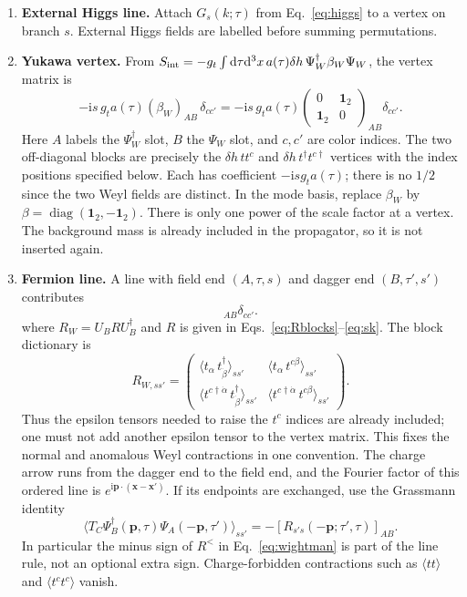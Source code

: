 \documentclass[a4paper,12pt]{article}
\newcommand{\ii}{\mathrm i}
\newcommand{\dd}{\mathrm d}
\newcommand{\one}{\mathbf1_2}
\begin{document}
\begin{enumerate}
\item \textbf{External Higgs line.} Attach $G_s(k;\tau)$ from
Eq.~\eqref{eq:higgs} to a vertex on branch $s$. External Higgs fields are
labelled before summing permutations.

\item \textbf{Yukawa vertex.} From
$S_{\rm int}=-g_t\int\dd\tau\dd^3x\,a(\tau)\delta h\,
\Psi_W^\dagger\beta_W\Psi_W$, the vertex matrix is
\begin{equation}
 -\ii s\,g_t a(\tau)(\beta_W)_{AB}\,\delta_{cc'}
 =-\ii s\,g_t a(\tau)
 \begin{pmatrix}0&\one\\\one&0\end{pmatrix}_{AB}\delta_{cc'}.
 \label{eq:vertex-rule}
\end{equation}
Here $A$ labels the $\Psi_W^\dagger$ slot, $B$ the $\Psi_W$ slot, and
$c,c'$ are color indices. The two off-diagonal blocks are precisely the
$\delta h\,tt^c$ and $\delta h\,t^\dagger t^{c\dagger}$ vertices with the
index positions specified below. Each has coefficient $-\ii s g_t a(\tau)$;
there is no $1/2$ since the two Weyl fields are distinct. In the mode basis,
replace $\beta_W$ by $\beta=\operatorname{diag}(\one,-\one)$.
There is only one power of the scale factor at a vertex. The background mass
is already included in the propagator, so it is not inserted again.

\item \textbf{Fermion line.} A line with field end $(A,\tau,s)$ and dagger
end $(B,\tau',s')$ contributes
\begin{equation}
 [R_{W,ss'}(\bm p;\tau,\tau')]_{AB}\delta_{cc'}.
\end{equation}
where $R_W=U_BR U_B^\dagger$ and $R$ is given in
Eqs.~\eqref{eq:Rblocks}--\eqref{eq:sk}. The block dictionary is
\begin{equation}
 R_{W,ss'}=
 \begin{pmatrix}
 \langle t_\alpha\,t^\dagger_{\dot\beta}\rangle_{ss'}&
 \langle t_\alpha\,t^{c\beta}\rangle_{ss'}\\
 \langle t^{c\dagger\dot\alpha}\,t^\dagger_{\dot\beta}\rangle_{ss'}&
 \langle t^{c\dagger\dot\alpha}\,t^{c\beta}\rangle_{ss'}
 \end{pmatrix}.
 \label{eq:weyl-line-rule}
\end{equation}
Thus the epsilon tensors needed to raise the $t^c$ indices are already included;
one must not add another epsilon tensor to the vertex matrix. This fixes the
normal and anomalous Weyl contractions in one convention. The charge arrow runs
from the dagger end to the field end, and the Fourier factor of this ordered
line is $e^{\ii\bm p\cdot(\bm x-\bm x')}$.
If its endpoints are exchanged, use the Grassmann identity
\begin{equation}
 \langle T_C\Psi^\dagger_B(\bm p,\tau)\Psi_A(-\bm p,\tau')\rangle_{ss'}
 =-[R_{s's}(-\bm p;\tau',\tau)]_{AB}.
 \label{eq:reverse-line-rule}
\end{equation}
In particular the minus sign of $R^<$ in Eq.~\eqref{eq:wightman} is part of
the line rule, not an optional extra sign. Charge-forbidden contractions such
as $\langle tt\rangle$ and $\langle t^ct^c\rangle$ vanish.


\end{enumerate}
\end{document}
